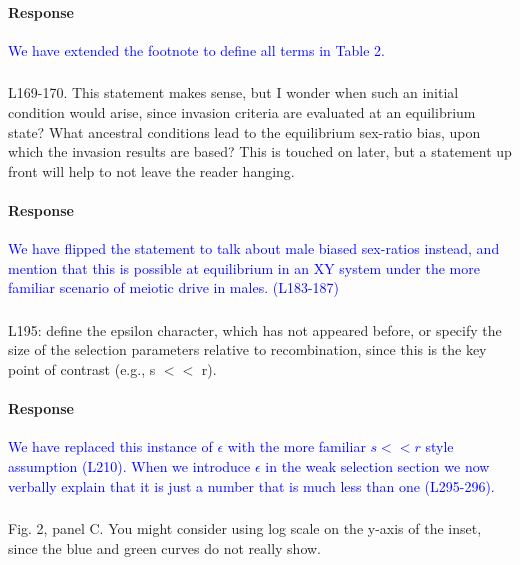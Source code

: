 \documentclass[10pt,letterpaper]{article}
\begin{document}
\noindent\paragraph{Response}
\textcolor{blue}{We have extended the footnote to define all terms in Table 2.}

\noindent\subsubsection{}
L169-170. This statement makes sense, but I wonder when such an initial condition would arise, since invasion criteria are evaluated at an equilibrium state? What ancestral conditions lead to the equilibrium sex-ratio bias, upon which the invasion results are based? This is touched on later, but a statement up front will help to not leave the reader hanging.

\noindent\paragraph{Response}
\textcolor{blue}{We have flipped the statement to talk about male biased sex-ratios instead, and mention that this is possible at equilibrium in an XY system under the more familiar scenario of meiotic drive in males. (L183-187)}

\noindent\subsubsection{}
L195: define the epsilon character, which has not appeared before, or specify the size of the selection parameters relative to recombination, since this is the key point of contrast (e.g., s $<<$ r).

\noindent\paragraph{Response}
\textcolor{blue}{We have replaced this instance of $\epsilon$ with the more familiar $s<<r$ style assumption (L210). When we introduce $\epsilon$ in the weak selection section we now verbally explain that it is just a number that is much less than one (L295-296).}

\noindent\subsubsection{}
Fig. 2, panel C. You might consider using log scale on the y-axis of the inset, since the blue and green curves do not really show.
\end{document}
